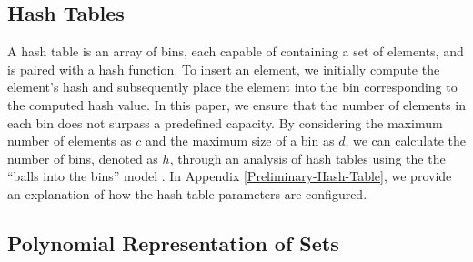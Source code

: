 
\vspace{-2mm}



\vspace{-1mm}

\subsection{Hash Tables}
\vspace{-.5mm}

A hash table is an array of bins, each capable of containing a set of elements, and is paired with a hash function. To insert an element, we initially compute the element's hash and subsequently place the element into the bin corresponding to the computed hash value. In this paper, we ensure that the number of elements in each bin does not surpass a predefined capacity. By considering the maximum number of elements as $c$ and the maximum size of a bin as $d$, we can calculate the number of bins, denoted as $h$, through an analysis of hash tables using the the ``balls into the bins'' model  \cite{DBLP:conf/stoc/BerenbrinkCSV00}. In Appendix \ref{Preliminary-Hash-Table}, we provide an explanation of how the hash table parameters are configured.




\vspace{-3mm}



\vspace{-3mm}

\subsection{Polynomial Representation of Sets}\label{sec::poly-rep}
\vspace{-1mm}

